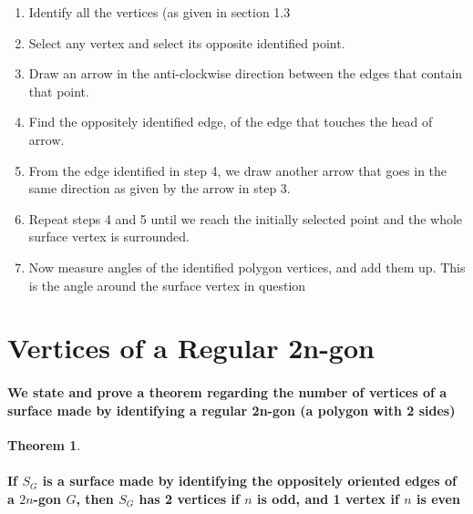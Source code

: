 \documentclass{report}
\newtheorem{theorem}{Theorem}[chapter]
\begin{document}
\begin{enumerate}
\item  {Identify all the vertices (as given in section 1.3}

\item  {Select any vertex and select its opposite identified point.}

\item  {Draw an arrow in the anti-clockwise direction between the edges that contain that point.}

\item  {Find the oppositely identified edge, of the edge that touches the head of arrow.}

\item  {From the edge identified in step 4, we draw another arrow that goes in the same direction as given by the arrow in step 3.}

\item  {Repeat steps 4 and 5 until we reach the initially selected point and the whole surface vertex is surrounded.}

\item  {Now measure angles of the identified polygon vertices, and add them up. This is the angle around the surface vertex in question}
\end{enumerate}


\section{Vertices of a Regular 2n-gon}

\paragraph{We state and prove a theorem regarding the number of vertices of a surface made by identifying a regular 2n-gon (a polygon with 2 sides)}


\begin{theorem}
{\paragraph{If $S_G$ is a surface made by identifying the oppositely oriented edges of a $2n$-gon $G$, then 
$S_G$ has 2 vertices if $n$ is odd, and 1 vertex if $n$ is even}}
\end{theorem}
\end{document}
